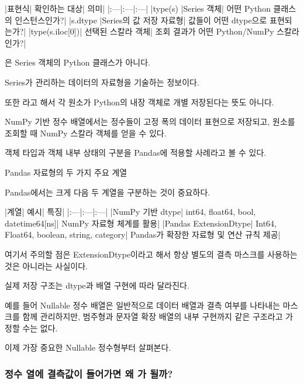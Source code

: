 \begin{dhktable}
|표현식|	확인하는 대상|	의미|
|:---|:---|:---|
|type(s)	|Series 객체|	어떤 Python 클래스의 인스턴스인가?|
|s.dtype	|Series의 값 저장 자료형|	값들이 어떤 dtype으로 표현되는가?|
|type(s.iloc[0])|	선택된 스칼라 객체|	조회 결과가 어떤 Python/NumPy 스칼라인가?|
\end{dhktable}

은 Series 객체의 Python 클래스가 아니다.

Series가 관리하는 데이터의 자료형을 기술하는 정보이다.

또한 라고 해서 각 원소가 Python의 내장  객체로 개별 저장된다는 뜻도 아니다.

NumPy 기반 정수 배열에서는 정수들이 고정 폭의 데이터 표현으로 저장되고, 원소를 조회할 때 NumPy 스칼라 객체를 얻을 수 있다.

객체 타입과 객체 내부 상태의 구분을 Pandas에 적용할 사례라고 볼 수 있다.

\begin{dhknote}
\begin{dhksmry}[centered]
Pandas 자료형의 두 가지 주요 계열
\end{dhksmry}
\end{dhknote}

Pandas에서는 크게 다음 두 계열을 구분하는 것이 중요하다.

\begin{dhktable}
|계열|	예시|	특징|
|:---|:---|:---|
|NumPy 기반 dtype|	int64, float64, bool, datetime64[ns]|	NumPy 자료형 체계를 활용|
|Pandas ExtensionDtype|	Int64, Float64, boolean, string, category|	Pandas가 확장한 자료형 및 연산 규칙 제공|
\end{dhktable}

여기서 주의할 점은 ExtensionDtype이라고 해서 항상 별도의 결측 마스크를 사용하는 것은 아니라는 사실이다.

실제 저장 구조는 dtype과 배열 구현에 따라 달라진다.

예를 들어 Nullable 정수 배열은 일반적으로 데이터 배열과 결측 여부를 나타내는 마스크를 함께 관리하지만, 범주형과 문자열 확장 배열의 내부 구현까지 같은 구조라고 가정할 수는 없다.

이제 가장 중요한 Nullable 정수형부터 살펴본다.

\subsubsection{정수 열에 결측값이 들어가면 왜 가 될까?}

